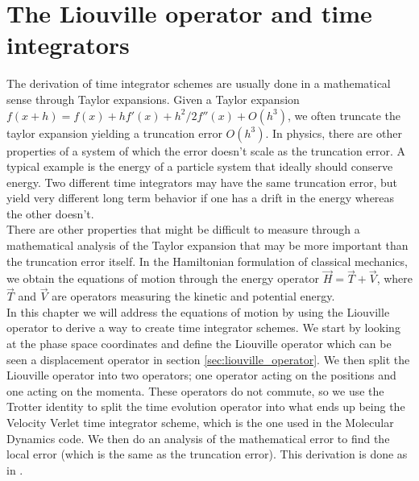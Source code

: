 \chapter{The Liouville operator and time integrators}
The derivation of time integrator schemes are usually done in a mathematical sense through Taylor expansions. Given a Taylor expansion $f(x+h) = f(x) + hf'(x) + h^2/2f''(x) + O(h^3)$, we often truncate the taylor expansion yielding a truncation error $O(h^3)$. In physics, there are other properties of a system of which the error doesn't scale as the truncation error. A typical example is the energy of a particle system that ideally should conserve energy. Two different time integrators may have the same truncation error, but yield very different long term behavior if one has a drift in the energy whereas the other doesn't.\\
There are other properties that might be difficult to measure through a mathematical analysis of the Taylor expansion that may be more important than the truncation error itself. In the Hamiltonian formulation of classical mechanics, we obtain the equations of motion through the energy operator $\vec H = \vec T + \vec V$, where $\vec T$ and $\vec V$ are operators measuring the kinetic and potential energy.\\
In this chapter we will address the equations of motion by using the Liouville operator to derive a way to create time integrator schemes. We start by looking at the phase space coordinates and define the Liouville operator which can be seen a displacement operator in section \ref{sec:liouville_operator}. We then split the Liouville operator into two operators; one operator acting on the positions and one acting on the momenta. These operators do not commute, so we use the Trotter identity to split the time evolution operator into what ends up being the Velocity Verlet time integrator scheme, which is the one used in the Molecular Dynamics code. We then do an analysis of the mathematical error to find the local error (which is the same as the truncation error). This derivation is done as in \cite{frenkel2001understanding}.
